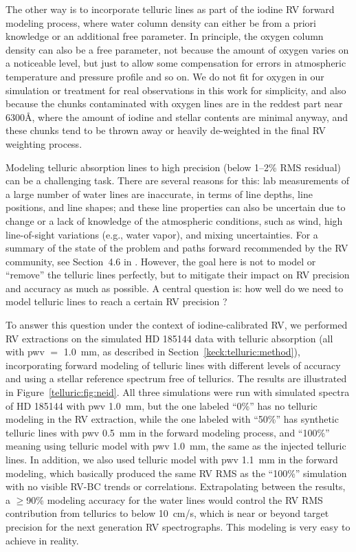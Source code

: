 The other way is to incorporate telluric lines as part of the iodine
RV forward modeling process, where water column density can either be
from a priori knowledge or an additional free parameter. In principle,
the oxygen column density can also be a free parameter, not because
the amount of oxygen varies on a noticeable level, but just to allow
some compensation for errors in atmospheric temperature and pressure
profile and so on. We do not fit for oxygen in our simulation or
treatment for real observations in this work for simplicity, and also
because the chunks contaminated with oxygen lines are in the reddest
part near 6300\AA, where the amount of iodine and stellar contents are
minimal anyway, and these chunks tend to be thrown away or heavily
de-weighted in the final RV weighting process.

Modeling telluric absorption lines to high precision (below 1--2\% RMS
residual) can be a challenging task. There are several reasons for
this: lab measurements of a large number of water lines are
inaccurate, in terms of line depths, line positions, and line shapes;
and these line properties can also be uncertain due to change or a
lack of knowledge of the atmospheric conditions, such as wind, high
line-of-sight variations (e.g., water vapor), and mixing
uncertainties. For a summary of the state of the problem and paths
forward recommended by the RV community, see Section~4.6 in
\cite{eprv2015}. However, the goal here is not to model or ``remove''
the telluric lines perfectly, but to mitigate their impact on RV
precision and accuracy as much as possible. A central question is: how
well do we need to model telluric lines to reach a certain RV
precision \citep{eprv2015}?

To answer this question under the context of iodine-calibrated RV, we
performed RV extractions on the simulated HD 185144 data with telluric
absorption (all with pwv $=$ 1.0~mm, as described in
Section~\ref{keck:telluric:method}), incorporating forward modeling of
telluric lines with different levels of accuracy and using a stellar
reference spectrum free of tellurics. The results are illustrated in
Figure~\ref{telluric:fig:neid}. All three simulations were run with
simulated spectra of HD 185144 with pwv 1.0~mm, but the one labeled
``0\%'' has no telluric modeling in the RV extraction, while the one
labeled with ``50\%'' has synthetic telluric lines with pwv 0.5~mm in
the forward modeling process, and ``100\%'' meaning using telluric
model with pwv 1.0~mm, the same as the injected telluric lines. In
addition, we also used telluric model with pwv 1.1~mm in the forward
modeling, which basically produced the same RV RMS as the ``100\%''
simulation with no visible RV-BC trends or correlations. Extrapolating
between the results, a $\geq$90\% modeling accuracy for the water
lines would control the RV RMS contribution from tellurics to below
10~cm/s, which is near or beyond target precision for the next
generation RV spectrographs. This modeling is very easy to achieve in
reality.

